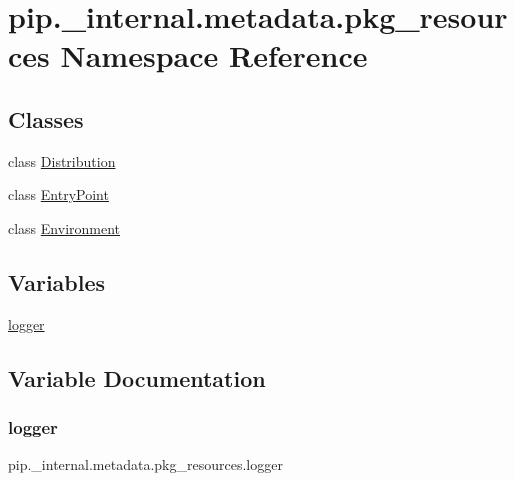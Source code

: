 \hypertarget{namespacepip_1_1__internal_1_1metadata_1_1pkg__resources}{}\section{pip.\+\_\+internal.\+metadata.\+pkg\+\_\+resources Namespace Reference}
\label{namespacepip_1_1__internal_1_1metadata_1_1pkg__resources}
\subsection*{Classes}
\begin{DoxyCompactItemize}
\item 
class \hyperlink{classpip_1_1__internal_1_1metadata_1_1pkg__resources_1_1Distribution}{Distribution}
\item 
class \hyperlink{classpip_1_1__internal_1_1metadata_1_1pkg__resources_1_1EntryPoint}{Entry\+Point}
\item 
class \hyperlink{classpip_1_1__internal_1_1metadata_1_1pkg__resources_1_1Environment}{Environment}
\end{DoxyCompactItemize}
\subsection*{Variables}
\begin{DoxyCompactItemize}
\item 
\hyperlink{namespacepip_1_1__internal_1_1metadata_1_1pkg__resources_a6777c102f6ce4c33be7f17d0b9a66e5c}{logger}
\end{DoxyCompactItemize}


\subsection{Variable Documentation}
\mbox{\label{namespacepip_1_1__internal_1_1metadata_1_1pkg__resources_a6777c102f6ce4c33be7f17d0b9a66e5c}} 
\subsubsection{\texorpdfstring{logger}{logger}}
{\footnotesize\ttfamily pip.\+\_\+internal.\+metadata.\+pkg\+\_\+resources.\+logger}

